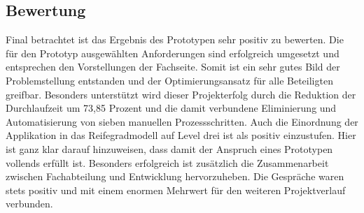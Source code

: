 \subsection{Bewertung}
Final betrachtet ist das Ergebnis des Prototypen sehr positiv zu bewerten. Die für den Prototyp ausgewählten Anforderungen sind erfolgreich umgesetzt und entsprechen den Vorstellungen der Fachseite. Somit ist ein sehr gutes Bild der Problemstellung entstanden und der Optimierungsansatz für alle Beteiligten greifbar. Besonders unterstützt wird dieser Projekterfolg durch die Reduktion der Durchlaufzeit um 73,85 Prozent und die damit verbundene Eliminierung und Automatisierung von sieben manuellen Prozessschritten. Auch die Einordnung der Applikation in das Reifegradmodell auf Level drei ist als positiv einzustufen. Hier ist ganz klar darauf hinzuweisen, dass damit der Anspruch eines Prototypen vollends erfüllt ist. Besonders erfolgreich ist zusätzlich die Zusammenarbeit zwischen Fachabteilung und Entwicklung hervorzuheben. Die Gespräche waren stets positiv und mit einem enormen Mehrwert für den weiteren Projektverlauf verbunden.
